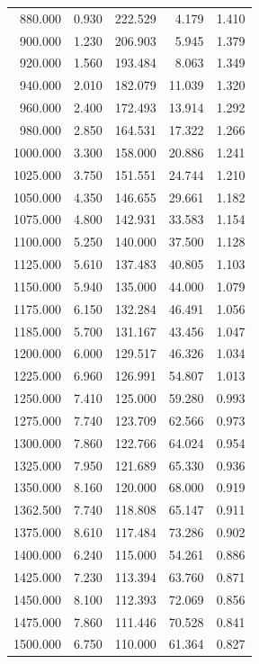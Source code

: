 \documentclass[english,11pt,a4paper]{article}
\begin{document}
\begin{multicols}{2}
\begin{table}[H]
\begin{tabular}{rr|rrr}
				880.000 & 0.930 & 222.529 & 4.179 & 1.410 \\
				900.000 & 1.230 & 206.903 & 5.945 & 1.379 \\
				920.000 & 1.560 & 193.484 & 8.063 & 1.349 \\
				940.000 & 2.010 & 182.079 & 11.039 & 1.320 \\
				960.000 & 2.400 & 172.493 & 13.914 & 1.292 \\
				980.000 & 2.850 & 164.531 & 17.322 & 1.266 \\
				1000.000 & 3.300 & 158.000 & 20.886 & 1.241 \\
				1025.000 & 3.750 & 151.551 & 24.744 & 1.210 \\
				1050.000 & 4.350 & 146.655 & 29.661 & 1.182 \\
				1075.000 & 4.800 & 142.931 & 33.583 & 1.154 \\
				1100.000 & 5.250 & 140.000 & 37.500 & 1.128 \\
				1125.000 & 5.610 & 137.483 & 40.805 & 1.103 \\
				1150.000 & 5.940 & 135.000 & 44.000 & 1.079 \\
				1175.000 & 6.150 & 132.284 & 46.491 & 1.056 \\
				1185.000 & 5.700 & 131.167 & 43.456 & 1.047 \\
				1200.000 & 6.000 & 129.517 & 46.326 & 1.034 \\
				1225.000 & 6.960 & 126.991 & 54.807 & 1.013 \\
				1250.000 & 7.410 & 125.000 & 59.280 & 0.993 \\
				1275.000 & 7.740 & 123.709 & 62.566 & 0.973 \\
				1300.000 & 7.860 & 122.766 & 64.024 & 0.954 \\
				1325.000 & 7.950 & 121.689 & 65.330 & 0.936 \\
				1350.000 & 8.160 & 120.000 & 68.000 & 0.919 \\
				1362.500 & 7.740 & 118.808 & 65.147 & 0.911 \\
				1375.000 & 8.610 & 117.484 & 73.286 & 0.902 \\
				1400.000 & 6.240 & 115.000 & 54.261 & 0.886 \\
				1425.000 & 7.230 & 113.394 & 63.760 & 0.871 \\
				1450.000 & 8.100 & 112.393 & 72.069 & 0.856 \\
				1475.000 & 7.860 & 111.446 & 70.528 & 0.841 \\
				1500.000 & 6.750 & 110.000 & 61.364 & 0.827 \\

\end{tabular}
\end{table}
\end{multicols}
\end{document}
